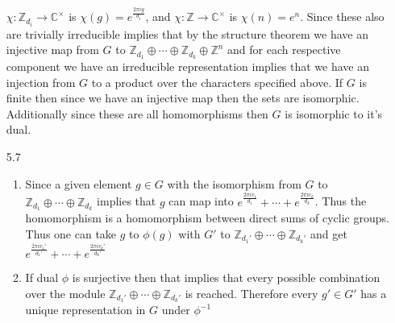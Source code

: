 \documentclass[12pt, letterpaper]{article}
\newcommand{\Z}{\mathbb{Z}}
\newcommand{\C}{\mathbb{C}}
\begin{document}
\begin{enumerate}
	$\chi: \Z_{d_i} \to \C^{\times}$ is $\chi(g) = e^{\frac{2 \pi i g }{d_i}}$, and $\chi:\Z \to \C^{\times}$ is 
	$\chi(n) = e^n$.  Since these also are trivially irreducible implies that by the structure theorem 
	we have an injective map from $G$ to $\Z_{d_1} \oplus \cdots \oplus \Z_{d_k} \oplus \Z^n$ and for each 
	respective component we have an irreducible representation implies that we have an injection from $G$ to a product 
	over the characters specified above.  If $G$ is finite then since we have an injective map then the sets 
	are isomorphic.  Additionally since these are all homomorphisms then $G$ is isomorphic to it's dual.
	\item[5.7]
	\begin{enumerate}
		\item Since a given element $g \in G$ with the isomorphism from $G$ to $\Z_{d_1} \oplus \cdots \oplus \Z_{d_k}$
		implies that $g$ can map into $e^{\frac{2 \pi i v_1}{d_1}} + \cdots + e^{\frac{2 \pi i v_k}{d_k}}$.
		Thus the homomorphism is a homomorphism between direct sums of cyclic groups.  Thus one can take 
		$g$ to $\phi(g)$ with $G'$ to $\Z_{d_1'} \oplus \cdots \oplus \Z_{d_k'}$ and get 
		$e^{\frac{2 \pi i v_1'}{d_1'}} + \cdots + e^{\frac{2 \pi i v_k'}{d_k'}}$
		\item If dual $\phi$ is surjective then that implies that every possible combination over the module 
		 $\Z_{d_1'} \oplus \cdots \oplus \Z_{d_k'}$ is reached.  Therefore every $g' \in G'$ has a unique 
		 representation in $G$ under $\phi^{-1}$
	\end{enumerate}
	
\end{enumerate}
\end{document}
